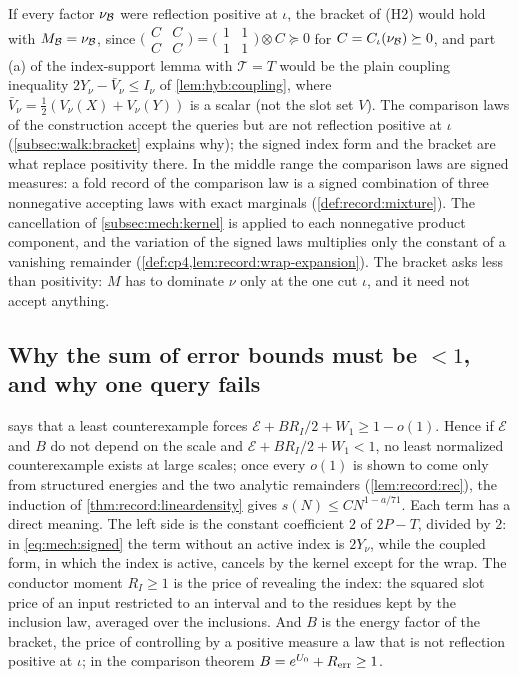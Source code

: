\begin{remark}\label{rem:mech:positive}
If every factor $\nu_\mathcal B$ were reflection positive at $\iota$, the bracket of
(H2) would hold with $M_\mathcal B=\nu_\mathcal B$, since
$\bigl(\begin{smallmatrix}C&C\\ C&C\end{smallmatrix}\bigr)=
\bigl(\begin{smallmatrix}1&1\\ 1&1\end{smallmatrix}\bigr)\otimes C\succeq0$ for
$C=C_\iota(\nu_\mathcal B)\succeq0$, and part (a) of the index-support lemma with
$\mathcal T=T$ would be the plain coupling inequality
$2Y_\nu-\bar V_\nu\le I_\nu$ of \cref{lem:hyb:coupling}, where
$\bar V_\nu=\frac12(V_\nu(X)+V_\nu(Y))$ is a scalar (not the slot
set $V$). The comparison laws of the
construction accept the queries but are not reflection positive at $\iota$
(\cref{subsec:walk:bracket} explains why); the signed index form and the
bracket are what replace positivity there. In the middle range the
comparison laws are signed measures: a fold record of the comparison law
is a signed combination of three nonnegative accepting laws with exact
marginals (\cref{def:record:mixture}). The cancellation of
\cref{subsec:mech:kernel} is applied to each nonnegative product component,
and the variation of the signed laws multiplies only the constant of a
vanishing remainder (\cref{def:cp4,lem:record:wrap-expansion}). The bracket asks less than
positivity: $M$ has to dominate $\nu$ only at the one cut $\iota$, and it need
not accept anything.
\end{remark}

\subsection{Why the sum of error bounds must be \texorpdfstring{$<1$}{<1}, and why one query fails}
\label{subsec:mech:budget}

 says that a least counterexample forces
$\mathcal E+BR_I/2+W_1\ge1-o(1)$. Hence if $\mathcal E$ and $B$ do
not depend on the scale and $\mathcal E+BR_I/2+W_1<1$, no least
normalized counterexample exists at large scales; once every $o(1)$
is shown to come only from structured energies and the two analytic
remainders (\cref{lem:record:rec}), the induction of
\cref{thm:record:lineardensity} gives $s(N)\le CN^{1-a/71}$. Each
term has a direct meaning. The left side is the constant coefficient $2$ of $2P-T$, divided by
$2$: in \eqref{eq:mech:signed} the term without an active index is $2Y_\nu$,
while the coupled form, in which the index is active, cancels by the kernel
except for the wrap. The conductor moment $R_I\ge1$ is the price of
revealing the index: the squared slot price of an input restricted to an
interval and to the residues kept by the inclusion law, averaged over the
inclusions. And $B$ is the energy factor of the bracket, the price of
controlling by a positive measure a law that is not reflection positive at
$\iota$; in the comparison theorem $B=e^{U_0}+R_{\rm err}\ge1$.


